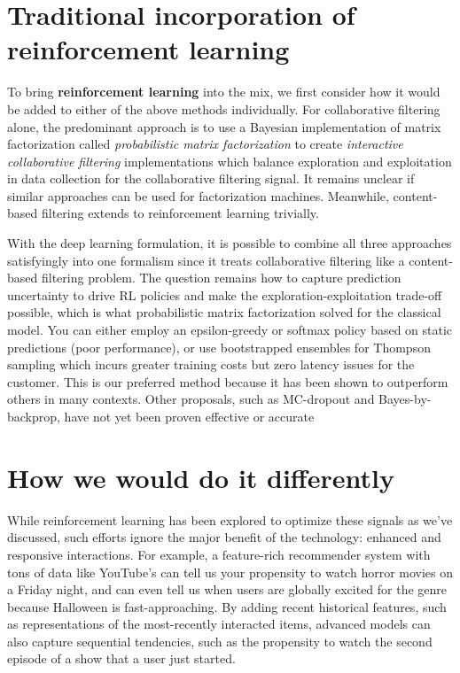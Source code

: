 \documentclass[manuscript, nonacm, screen=true]{acmart}
\begin{document}
\section{Traditional incorporation of reinforcement learning}

To bring \textbf{reinforcement learning} into the mix, we first consider how it would be added to either of the above methods individually. For collaborative filtering alone, the predominant approach is to use a Bayesian implementation of matrix factorization called \textit{probabilistic matrix factorization}\cite{PMF_probabilistic_matrix_factorization,BPMF_bayesian_probabilistic_matrix_factorization} to create \textit{interactive collaborative filtering}\cite{interactive_CF,interactive_CF2,interactive_CF3} implementations which balance exploration and exploitation in data collection for the collaborative filtering signal. It remains unclear if similar approaches can be used for factorization machines. Meanwhile, content-based filtering extends to reinforcement learning trivially. 

With the deep learning formulation, it is possible to combine all three approaches satisfyingly into one formalism since it treats collaborative filtering like a content-based filtering problem. The question remains how to capture prediction uncertainty to drive RL policies and make the exploration-exploitation trade-off possible, which is what probabilistic matrix factorization solved for the classical model. You can either employ an epsilon-greedy or softmax policy based on static predictions (poor performance), or use bootstrapped ensembles for Thompson sampling\cite{randomized_prior_functions, bootstrap_DQN, thompson_sampling} which incurs greater training costs but zero latency issues for the customer. This is our preferred method because it has been shown to outperform others in many contexts\cite{thompson_sampling1, thompson_sampling2, thompson_sampling3}. Other proposals, such as MC-dropout\cite{monte_carlo_dropout} and Bayes-by-backprop\cite{bayes_by_backprop}, have not yet been proven effective or accurate\cite{risk_versus_uncertainty}

\section{How we would do it differently}

While reinforcement learning has been explored to optimize these signals as we've discussed, such efforts ignore the major benefit of the technology: enhanced and responsive interactions. For example, a feature-rich recommender system with tons of data like YouTube's can tell us your propensity to watch horror movies on a Friday night, and can even tell us when users are globally excited for the genre because Halloween is fast-approaching. By adding recent historical features, such as representations of the most-recently interacted items, advanced models can also capture sequential tendencies, such as the propensity to watch the second episode of a show that a user just started. 
\end{document}
